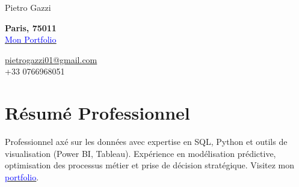 \documentclass[letterpaper,10.5pt]{article}
\begin{document}

\begin{center}
    {\LARGE Pietro Gazzi}\\
        \begin{multicols}{2}
        \begin{flushleft}
            \textbf{Paris, 75011}\\
            \href{https://pietrowei.github.io/Portfolio}{\underline{\textcolor{blue}{Mon Portfolio}}}
        \end{flushleft}
        \begin{flushright}
            \href{mailto:pietrogazzi01@gmail.com}{pietrogazzi01@gmail.com}\\
            +33 0766968051
        \end{flushright}
    \end{multicols}
\end{center}

\section*{Résumé Professionnel}\vspace{-5pt}
Professionnel axé sur les données avec expertise en SQL, Python et outils de visualisation (Power BI, Tableau). Expérience en modélisation prédictive, optimisation des processus métier et prise de décision stratégique. Visitez mon \href{https://pietrowei.github.io/Portfolio}{\underline{\textcolor{blue}{portfolio}}}.

\end{document}
